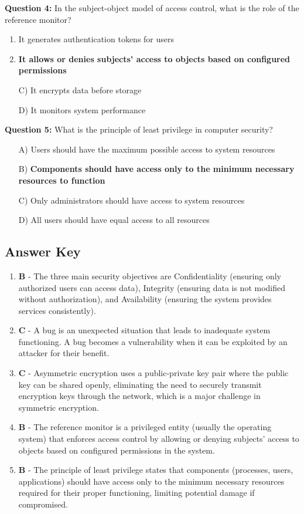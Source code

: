 \textbf{Question 4:} In the subject-object model of access control, what is the role of the reference monitor?

\begin{enumerate}
    \item It generates authentication tokens for users
    \item \textbf{It allows or denies subjects' access to objects based on configured permissions}
    \item[C)] It encrypts data before storage
    \item[D)] It monitors system performance
\end{enumerate}

\textbf{Question 5:} What is the principle of least privilege in computer security?

\begin{enumerate}
    \item[A)] Users should have the maximum possible access to system resources
    \item[B)] \textbf{Components should have access only to the minimum necessary resources to function}
    \item[C)] Only administrators should have access to system resources
    \item[D)] All users should have equal access to all resources
\end{enumerate}

\subsection{Answer Key}

\begin{enumerate}
    \item \textbf{B} - The three main security objectives are Confidentiality (ensuring only authorized users can access data), Integrity (ensuring data is not modified without authorization), and Availability (ensuring the system provides services consistently).
    
    \item \textbf{C} - A bug is an unexpected situation that leads to inadequate system functioning. A bug becomes a vulnerability when it can be exploited by an attacker for their benefit.
    
    \item \textbf{C} - Asymmetric encryption uses a public-private key pair where the public key can be shared openly, eliminating the need to securely transmit encryption keys through the network, which is a major challenge in symmetric encryption.
    
    \item \textbf{B} - The reference monitor is a privileged entity (usually the operating system) that enforces access control by allowing or denying subjects' access to objects based on configured permissions in the system.
    
    \item \textbf{B} - The principle of least privilege states that components (processes, users, applications) should have access only to the minimum necessary resources required for their proper functioning, limiting potential damage if compromised.
\end{enumerate}
